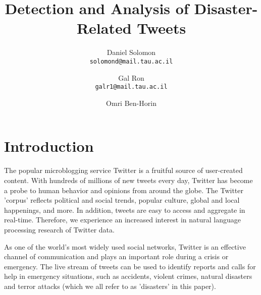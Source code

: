 \documentclass[letterpaper,twocolumn,10pt]{article}
\begin{document}
\date{}

\title{\Large \bf Detection and Analysis of Disaster-Related Tweets}

\author{
{\rm Daniel Solomon}\\
\texttt{solomond@mail.tau.ac.il}
\and
{\rm Gal Ron}\\
\texttt{galr1@mail.tau.ac.il‬}
\and
{\rm Omri Ben-Horin}\\
\texttt{}
}

\maketitle

\thispagestyle{empty}


\abstract{}

\begin{center}
	\parbox{200pt}{
	}
\end{center}

\section{Introduction}
The popular microblogging service Twitter is a fruitful source of user-created content. With hundreds of millions of new tweets every day, Twitter has become a probe to human behavior and opinions from around the globe. The Twitter 'corpus' reflects political and social trends, popular culture, global and local happenings, and more. In addition, tweets are easy to access and aggregate in real-time. Therefore, we experience an increased interest in natural language processing research of Twitter data.

As one of the world's most widely used social networks, Twitter is an effective channel of communication and plays an important role during a crisis or emergency. The live stream of tweets can be used to identify reports and calls for help in emergency situations, such as accidents, violent crimes, natural disasters and terror attacks (which we all refer to as 'disasters' in this paper).
\end{document}
